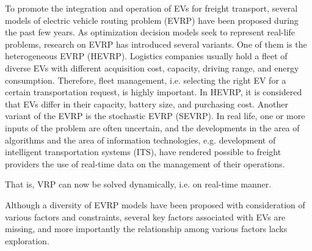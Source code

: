 \documentclass[11pt]{article}
\begin{document}
To promote the integration and operation of EVs for freight transport, several models of electric vehicle routing problem (EVRP) have been proposed during the past few years. As optimization decision models seek to represent real-life problems, research on EVRP has introduced several variants. One of them is the heterogeneous EVRP (HEVRP). Logistics companies usually hold a fleet of diverse EVs with different acquisition cost, capacity, driving range, and energy consumption. Therefore, fleet management, i.e. selecting the right EV for a certain transportation request, is highly important. In HEVRP, it is considered that EVs differ in their capacity, battery size, and purchasing cost. Another variant of the EVRP is the stochastic EVRP (SEVRP). In real life, one or more inputs of the problem are often uncertain, and the developments in the area of algorithms and the area of information technologies, e.g. development of intelligent transportation systems (ITS), have rendered possible to freight providers the use of real-time data on the management of their operations. 

That is, VRP can now be solved dynamically, i.e. on real-time manner. 


Although a diversity of EVRP models have been proposed with consideration of various factors and constraints, several key factors associated with EVs are missing, and more importantly the relationship among various factors lacks exploration. 
\end{document}
